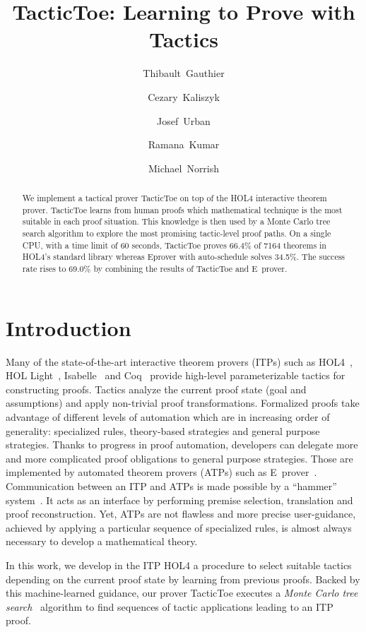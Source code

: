 \documentclass[runningheads,a4paper,draft]{svjour3}
\title{TacticToe: Learning to Prove with Tactics}
\author{\mbox{Thibault Gauthier} \and \mbox{Cezary Kaliszyk} \and \mbox{Josef
Urban} \and \mbox{Ramana Kumar} \and \mbox{Michael Norrish}}
\institute{Thibault Gauthier and Cezary Kaliszyk \at
Department of Computer Science, University of Innsbruck,
Innsbruck, Austria\\ \url{{thibault.gauthier,cezary.kaliszyk}@uibk.ac.at}
\and
Josef Urban \at Czech Technical University, Prague\\\url{josef.urban@gmail.com}
\and Ramana Kumar and Michael Norrish \at Data61}
\def\holfour{\textsf{HOL4}\xspace}
\def\isabelle{\textsf{Isabelle}\xspace}
\def\hollight{\textsf{HOL Light}\xspace}
\def\coq{\textsf{Coq}\xspace}
\def\eprover{\textsf{E~prover}\xspace}
\def\tactictoe{\textsf{TacticToe}\xspace}
\begin{document}
\maketitle

\begin{abstract}
We implement a tactical prover TacticToe on top of the HOL4 interactive theorem
prover. TacticToe learns from human proofs which mathematical technique is
the most suitable in each proof situation.
This knowledge is then used by a Monte Carlo tree search algorithm to
explore the most promising tactic-level proof paths.
On a single CPU, with a time limit of 60 seconds, TacticToe proves 66.4\% of
7164 theorems in HOL4's standard library whereas
Eprover with auto-schedule solves 34.5\%. The success rate rises to 69.0\% by 
combining the results of TacticToe and E~prover.
\end{abstract}

\section{Introduction}
Many of the state-of-the-art interactive theorem provers (ITPs) such as
  \holfour~\cite{hol4}, \hollight~\cite{Harrison09hollight},
  \isabelle~\cite{isabelle}
  and \coq~\cite{coq-book} provide high-level parameterizable tactics for constructing proofs.
  Tactics analyze the current proof state (goal and
  assumptions) and apply non-trivial proof transformations.
  Formalized proofs take advantage of different levels of automation which are 
  in increasing order of generality:
  specialized rules, theory-based strategies and general purpose strategies.
  Thanks to progress in proof
  automation, developers can delegate more and more complicated proof
  obligations to general purpose strategies. Those are implemented by automated
  theorem provers (ATPs) such as \eprover~\cite{eprover}. Communication
  between
  an ITP and ATPs is made possible by a ``hammer''
  system~\cite{hammers4qed,tgck-cpp15}. It acts as an interface by performing
  premise selection, translation and proof reconstruction.
  Yet, ATPs are not flawless and more precise user-guidance, achieved
  by applying a particular sequence of specialized rules, is almost always
  necessary to develop a mathematical theory.

  In this work, we develop in the ITP \holfour a procedure to select suitable
  tactics depending on the current proof state by learning
  from previous proofs. Backed by this machine-learned guidance, our prover
  \tactictoe executes a \emph{Monte
  Carlo tree search}~\cite{montecarlo} algorithm to find sequences of tactic 
  applications
  leading to an ITP proof.
\end{document}

